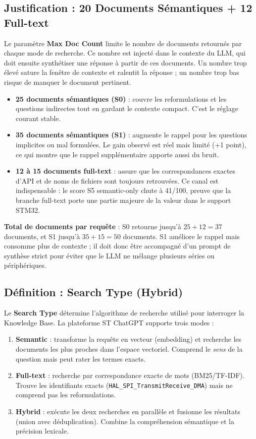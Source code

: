 \subsection{Justification : 20 Documents Sémantiques + 12 Full-text}
\label{sec:max_documents}

Le paramètre \textbf{Max Doc Count} limite le nombre de documents retournés par chaque mode de recherche. Ce nombre est injecté dans le contexte du LLM, qui doit ensuite synthétiser une réponse à partir de ces documents. Un nombre trop élevé sature la fenêtre de contexte et ralentit la réponse ; un nombre trop bas risque de manquer le document pertinent.

\begin{itemize}
  \item \textbf{25 documents sémantiques (S0)} : couvre les reformulations et les questions indirectes tout en gardant le contexte compact. C'est le réglage courant stable.
  \item \textbf{35 documents sémantiques (S1)} : augmente le rappel pour les questions implicites ou mal formulées. Le gain observé est réel mais limité (+1 point), ce qui montre que le rappel supplémentaire apporte aussi du bruit.
  \item \textbf{12 à 15 documents full-text} : assure que les correspondances exactes d'API et de noms de fichiers sont toujours retrouvées. Ce canal est indispensable : le score S5 semantic-only chute à 41/100, preuve que la branche full-text porte une partie majeure de la valeur dans le support STM32.
\end{itemize}

\textbf{Total de documents par requête} : S0 retourne jusqu'à $25 + 12 = 37$ documents, et S1 jusqu'à $35 + 15 = 50$ documents. S1 améliore le rappel mais consomme plus de contexte ; il doit donc être accompagné d'un prompt de synthèse strict pour éviter que le LLM ne mélange plusieurs séries ou périphériques.

\subsection{Définition : Search Type (Hybrid)}
\label{sec:search_type}

Le \textbf{Search Type} détermine l'algorithme de recherche utilisé pour interroger la Knowledge Base. La plateforme ST ChatGPT supporte trois modes :

\begin{enumerate}
  \item \textbf{Semantic} : transforme la requête en vecteur (embedding) et recherche les documents les plus proches dans l'espace vectoriel. Comprend le \textit{sens} de la question mais peut rater les termes exacts.
  \item \textbf{Full-text} : recherche par correspondance exacte de mots (BM25/TF-IDF). Trouve les identifiants exacts (\texttt{HAL\_SPI\_TransmitReceive\_DMA}) mais ne comprend pas les reformulations.
  \item \textbf{Hybrid} : exécute les deux recherches en parallèle et fusionne les résultats (union avec déduplication). Combine la compréhension sémantique et la précision lexicale.
\end{enumerate}

